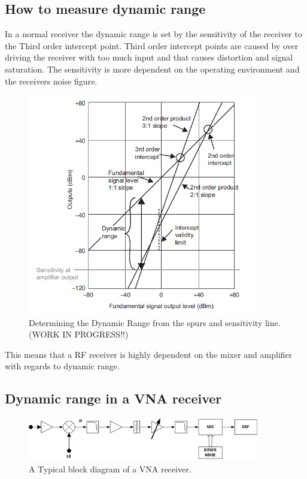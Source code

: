 \subsection{How to measure dynamic range}

In a normal receiver the dynamic range is set by the sensitivity of the receiver to the Third order intercept point. Third order intercept points are caused by over driving the receiver with too much input and that causes distortion and signal saturation. The sensitivity is more dependent on the operating environment and the receivers noise figure. \citep{understandDynamic}


\begin{figure}[H]
\centering
\includegraphics[width=0.90\textwidth]{figures/Dynamic_range_calc.png}
\caption{Determining the Dynamic Range from the spurs and sensitivity line.(WORK IN PROGRESS!!)}
\label{Dynamic_range_calc}
\end{figure}
 
 This means that a RF receiver is highly dependent on the mixer and amplifier with regards to dynamic range.\\

\subsection{Dynamic range in a VNA receiver}
\begin{figure}[H]
\centering
\includegraphics[width=0.90\textwidth]{figures/Block_VNA.png}
\caption{A Typical block diagram of a VNA receiver.}
\label{Block_VNA}
\end{figure}

